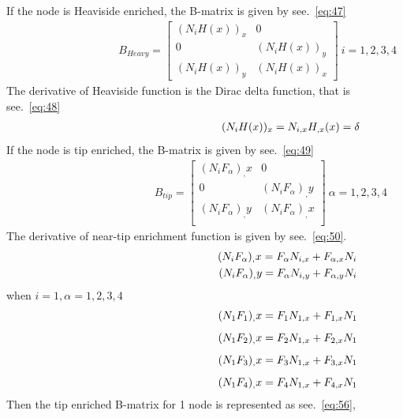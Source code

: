 \documentclass[fleqn, 12.5pt,a4paper]{report}
\begin{document}
If the node is Heaviside enriched, the B-matrix\cite{khoei2014extended} is given by see.~\autoref{eq:47}
\begin{align}\label{eq:47}
\hspace{4cm} B_{Heavy} = \begin{bmatrix}
(N_i H(x))_x & 0\\
0 & (N_i H(x))_y\\
(N_i H(x))_y & (N_i H(x))_x
\end{bmatrix}
\: i=1,2,3,4
\end{align}
The derivative of Heaviside function is the Dirac delta function\cite{khoei2014extended}, that is see.~\autoref{eq:48}
\begin{align}\label{eq:48}
\hspace{5.5cm} (N_i H(x))_x = N_{i,x} H_{,x}(x) = \delta
\end{align}
If the node is tip enriched, the B-matrix \cite{khoei2014extended} is given by see.~\autoref{eq:49}
\begin{align}\label{eq:49}
\hspace{5cm} B_{tip} = \begin{bmatrix}
(N_i F_{\alpha})_,x & 0\\
0 & (N_i F_{\alpha})_,y\\
(N_i F_{\alpha})_,y & (N_i F_{\alpha})_,x\\
\end{bmatrix}
\: \alpha = 1,2,3,4
\end{align}
The derivative of near-tip enrichment function\cite{khoei2014extended} is given by see.~\autoref{eq:50}.
\begin{align}\label{eq:50}
\hspace{5.25cm}(N_i F_{\alpha})_,x = F_{\alpha} N_{i,x} + F_{\alpha,x} N_i\\
(N_i F_{\alpha})_,y = F_{\alpha} N_{i,y} + F_{\alpha,y} N_i
\end{align}
when $i=1, \alpha = 1,2,3,4$ \vspace{-0.5cm}
\begin{align}\label{eq:52}
\hspace{5.25cm}(N_1 F_1)_,x = F_1 N_{1,x} + F_{1,x} N_1\\[5pt]
(N_1 F_2)_,x = F_2 N_{1,x} + F_{2,x} N_1\\[5pt]
(N_1 F_3)_,x = F_3 N_{1,x} + F_{3,x} N_1\\[5pt]
(N_1 F_4)_,x = F_4 N_{1,x} + F_{4,x} N_1
\end{align}
Then the tip enriched B-matrix for 1 node is represented as see.~\autoref{eq:56},
\end{document}
